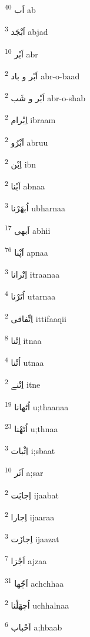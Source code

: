 \documentclass[12pt]{article}
\begin{document}
\begin{RTL}

\raggedleft
 
\begin{multicols}{5}
{\ur اَب}   \textsuperscript{40} ab

{\ur اَبْجَد}   \textsuperscript{3} abjad

{\ur اَبْر}   \textsuperscript{10} abr

{\ur اَبْر و باد}   \textsuperscript{2} abr-o-baad

{\ur اَبْر و شَب}   \textsuperscript{2} abr-o-shab

{\ur اِبْرام}   \textsuperscript{2} ibraam

{\ur اَبْرُو}   \textsuperscript{2} abruu

{\ur اِبْن}   \textsuperscript{2} ibn

{\ur اَبْنا}   \textsuperscript{2} abnaa

{\ur اُبھَرْنا}   \textsuperscript{3} ubharnaa

{\ur اَبھی}   \textsuperscript{17} abhii

{\ur اَپْنا}   \textsuperscript{76} apnaa

{\ur اِتْرانا}   \textsuperscript{3} itraanaa

{\ur اُتَرْنا}   \textsuperscript{4} utarnaa

{\ur اِتِّفاقی}   \textsuperscript{2} ittifaaqii

{\ur اِتْنا}   \textsuperscript{8} itnaa

{\ur اُتْنا}   \textsuperscript{4} utnaa

{\ur اِتْنے}   \textsuperscript{2} itne

{\ur اُٹھانا}   \textsuperscript{19} u;thaanaa

{\ur اُٹھْنا}   \textsuperscript{23} u;thnaa

{\ur اِثْبات}   \textsuperscript{3} i;sbaat

{\ur اَثَر}   \textsuperscript{10} a;sar

{\ur اِجابَت}   \textsuperscript{2} ijaabat

{\ur اِجارا}   \textsuperscript{2} ijaaraa

{\ur اِجازَت}   \textsuperscript{3} ijaazat

{\ur اَجْزا}   \textsuperscript{7} ajzaa

{\ur اَچّھا}   \textsuperscript{31} achchhaa

{\ur اُچھَلْنا}   \textsuperscript{2} uchhalnaa

{\ur اَحْباب}   \textsuperscript{6} a;hbaab


\end{multicols}
\end{RTL}
\end{document}
